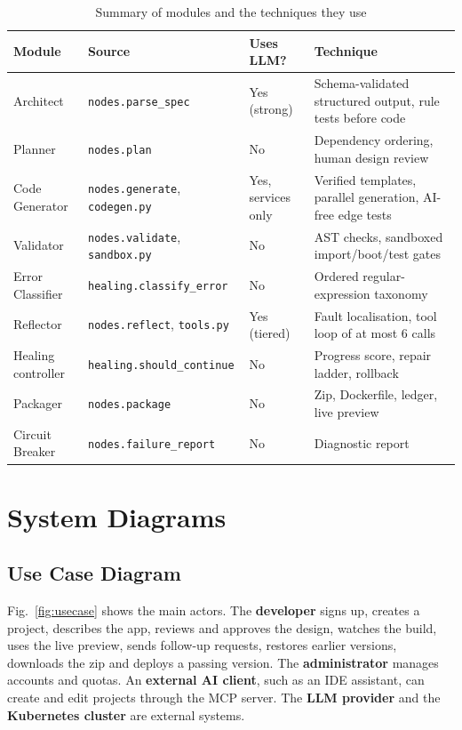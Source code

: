 \documentclass[12pt,a4paper]{report}
\begin{document}
\begin{table}[!ht]
    \centering
    \renewcommand{\arraystretch}{1.4}
        \small
        \caption{Summary of modules and the techniques they use}
        \begin{tabular}{|L{2.5cm}|L{4.2cm}|L{2.0cm}|L{5.0cm}|}
        \hline
        \textbf{Module} & \textbf{Source} & \textbf{Uses LLM?} & \textbf{Technique} \\\hline
        Architect & \texttt{nodes.parse\_spec} & Yes (strong) & Schema-validated structured output, rule tests before code \\\hline
        Planner & \texttt{nodes.plan} & No & Dependency ordering, human design review \\\hline
        Code Generator & \texttt{nodes.generate}, \texttt{codegen.py} & Yes, services only & Verified templates, parallel generation, AI-free edge tests \\\hline
        Validator & \texttt{nodes.validate}, \texttt{sandbox.py} & No & AST checks, sandboxed import/boot/test gates \\\hline
        Error Classifier & \texttt{healing.classify\_error} & No & Ordered regular-expression taxonomy \\\hline
        Reflector & \texttt{nodes.reflect}, \texttt{tools.py} & Yes (tiered) & Fault localisation, tool loop of at most 6 calls \\\hline
        Healing controller & \texttt{healing.should\_continue} & No & Progress score, repair ladder, rollback \\\hline
        Packager & \texttt{nodes.package} & No & Zip, Dockerfile, ledger, live preview \\\hline
        Circuit Breaker & \texttt{nodes.failure\_report} & No & Diagnostic report \\\hline
 \end{tabular}
 \label{tab:modules}
\end{table}

\section{System Diagrams}

\subsection{Use Case Diagram}

Fig.~\ref{fig:usecase} shows the main actors. The \textbf{developer} signs up, creates a project, describes the app, reviews and approves the design, watches the build, uses the live preview, sends follow-up requests, restores earlier versions, downloads the zip and deploys a passing version. The \textbf{administrator} manages accounts and quotas. An \textbf{external AI client}, such as an IDE assistant, can create and edit projects through the MCP server. The \textbf{LLM provider} and the \textbf{Kubernetes cluster} are external systems.
\end{document}
